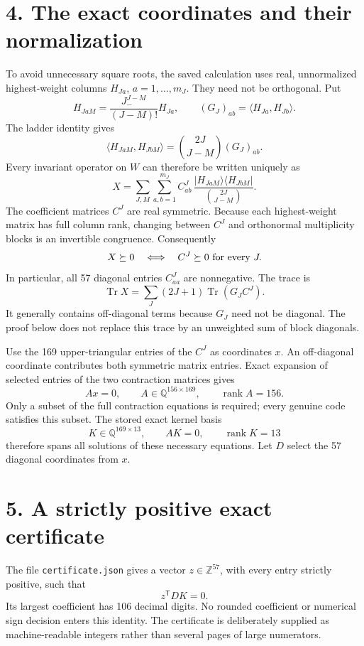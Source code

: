 \documentclass[11pt]{article}
\newcommand{\Tr}{\operatorname{Tr}}
\begin{document}
\section*{4. The exact coordinates and their normalization}
To avoid unnecessary square roots, the saved calculation uses real, unnormalized highest-weight columns $H_{Ja}$, $a=1,\ldots,m_J$. They need not be orthogonal. Put
\[
 H_{JaM}=\frac{J_-^{J-M}}{(J-M)!}H_{Ja},\qquad
 (G_J)_{ab}=\langle H_{Ja},H_{Jb}\rangle.
\]
The ladder identity gives
\[
 \langle H_{JaM},H_{JbM}\rangle
 =\binom{2J}{J-M}(G_J)_{ab}.
\]
Every invariant operator on $W$ can therefore be written uniquely as
\[
 X=\sum_{J,M}\sum_{a,b=1}^{m_J}
 C^J_{ab}\,
 \frac{|H_{JaM}\rangle\langle H_{JbM}|}{\binom{2J}{J-M}}.
\]
The coefficient matrices $C^J$ are real symmetric. Because each highest-weight matrix has full column rank, changing between $C^J$ and orthonormal multiplicity blocks is an invertible congruence. Consequently
\[
 X\succeq0\quad\Longleftrightarrow\quad C^J\succeq0
 \ \hbox{for every }J.
\]
In particular, all 57 diagonal entries $C^J_{aa}$ are nonnegative. The trace is
\[
 \Tr X=\sum_J(2J+1)\Tr(G_JC^J).
\]
It generally contains off-diagonal terms because $G_J$ need not be diagonal. The proof below does not replace this trace by an unweighted sum of block diagonals.

Use the 169 upper-triangular entries of the $C^J$ as coordinates $x$. An off-diagonal coordinate contributes both symmetric matrix entries. Exact expansion of selected entries of the two contraction matrices gives
\[
 Ax=0,\qquad A\in\mathbb Q^{156\times169},\qquad\operatorname{rank}A=156.
\]
Only a subset of the full contraction equations is required; every genuine code satisfies this subset. The stored exact kernel basis
\[
 K\in\mathbb Q^{169\times13},\qquad AK=0,
 \qquad\operatorname{rank}K=13
\]
therefore spans all solutions of these necessary equations. Let $D$ select the 57 diagonal coordinates from $x$.

\section*{5. A strictly positive exact certificate}
The file \texttt{certificate.json} gives a vector $z\in\mathbb Z^{57}$, with every entry strictly positive, such that
\[
 \boxed{z^{\mathsf T}DK=0.}
\]
Its largest coefficient has 106 decimal digits. No rounded coefficient or numerical sign decision enters this identity. The certificate is deliberately supplied as machine-readable integers rather than several pages of large numerators.
\end{document}
